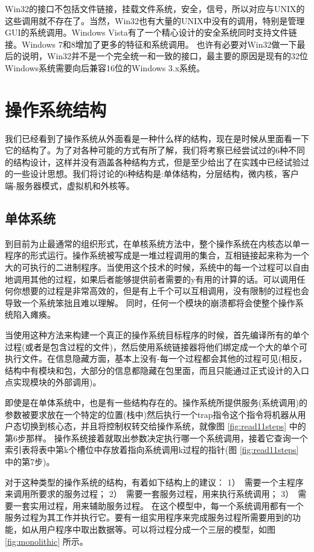    Win32的接口不包括文件链接，挂载文件系统，安全，信号，所以对应与UNIX的这些调用就不存在了。当然，Win32也有大量的UNIX中没有的调用，特别是管理GUI的系统调用。Windows Vista有了一个精心设计的安全系统同时支持文件链接。Windows 7和8增加了更多的特征和系统调用。
   也许有必要对Win32做一下最后的说明，Win32并不是一个完全统一和一致的接口，最主要的原因是现有的32位Windows系统需要向后兼容16位的Windows 3.x系统。
   
   \section{操作系统结构}
   
   我们已经看到了操作系统从外面看是一种什么样的结构，现在是时候从里面看一下它的结构了。为了对各种可能的方式有所了解，我们将考察已经尝试过的6种不同的结构设计，这样并没有涵盖各种结构方式，但是至少给出了在实践中已经试验过的一些设计思想。我们将讨论的6种结构是:单体结构，分层结构，微内核，客户端-服务器模式，虚拟机和外核等。
   
   \subsection{单体系统}
   
   到目前为止最通常的组织形式，在单核系统方法中，整个操作系统在内核态以单一程序的形式运行。操作系统被写成是一堆过程调用的集合，互相链接起来称为一个大的可执行的二进制程序。当使用这个技术的时候，系统中的每一个过程可以自由地调用其他的过程，如果后者能够提供前者需要的y有用的计算的话。可以调用任何你想要的过程是非常高效的，但是有上千个可以互相调用，没有限制的过程也会导致一个系统笨拙且难以理解。
   同时，任何一个模块的崩溃都将会使整个操作系统陷入瘫痪。
   
   当使用这种方法来构建一个真正的操作系统目标程序的时候，首先编译所有的单个过程(或者是包含过程的文件)，然后使用系统链接器将他们绑定成一个大的单个可执行文件。在信息隐藏方面，基本上没有-每一个过程都会其他的过程可见(相反，结构中有模块和包，大部分的信息都隐藏在包里面，而且只能通过正式设计的入口点实现模块的外部调用)。
   
   即使是在单体系统中，也是有一些结构存在的。操作系统所提供服务(系统调用)的参数被要求放在一个特定的位置(栈中)然后执行一个trap指令这个指令将机器从用户态切换到核心态，并且将控制权转交给操作系统，就像图 \ref{fig:read11steps} 中的第6步那样。
   操作系统接着就取出参数决定执行哪一个系统调用，接着它查询一个索引表将表中第k个槽位中存放着指向系统调用k过程的指针(图 \ref{fig:read11steps} 中的第7步)。
   
   对于这种类型的操作系统的结构，有着如下结构上的建议：
   1）　需要一个主程序来调用所要求的服务过程；
   2）　需要一套服务过程，用来执行系统调用；
   3）　需要一套实用过程，用来辅助服务过程。
   在这个模型中，每一个系统调用都有一个服务过程为其工作并执行它。要有一组实用程序来完成服务过程所需要用到的功能，如从用户程序中取出数据等。可以将过程分成一个三层的模型，如图　\ref{fig:monolithic} 所示。
   
